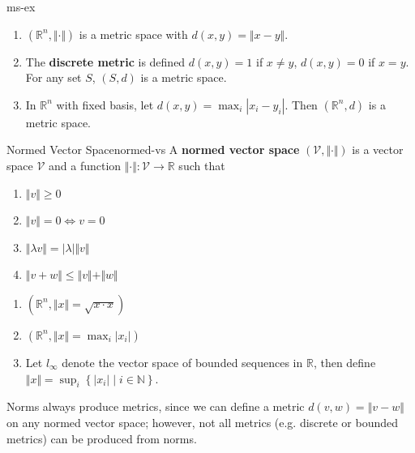 \documentclass[10pt]{report}
\begin{document}
\begin{ex}{}{ms-ex}
	 \begin{enumerate}
		 \item $(\mathbb{R}^n, \Vert{\cdot}\Vert)$ is a metric space with $d(x,y) = \Vert{x-y}\Vert$.
		 \item The \textbf{discrete metric} is defined $d(x,y)=1$ if $x\neq y$, $d(x,y)=0$ if $x=y$. For any set $S$, $(S,d)$ is a metric space.
		 \item In $\mathbb{R}^n$ with fixed basis, let $d(x,y)=\max_i |x_i-y_i|$. Then $(\mathbb{R}^n, d)$ is a metric space.
	\end{enumerate}
\end{ex}

\begin{defn}{Normed Vector Space}{normed-vs}
	A \textbf{normed vector space} $(\mathcal{V}, \Vert{\cdot}\Vert)$ is a vector space $\mathcal{V}$ and a function $\Vert{\cdot}\Vert:\mathcal{V}\to\mathbb{R}$ such that
	\begin{enumerate}
		\item $\Vert{v}\Vert\geq 0$ 
		\item $\Vert{v}\Vert=0 \iff v=0$
		\item $\Vert{\lambda v}\Vert=|\lambda| \Vert{v}\Vert$ 
		\item $\Vert{v+w}\Vert\leq \Vert{v}\Vert+\Vert{w}\Vert$
	\end{enumerate}
\end{defn}

\begin{ex}{}{}
	\begin{enumerate}
		\item $(\mathbb{R}^n, \Vert{x}\Vert=\sqrt{x\cdot x})$ 
		\item $(\mathbb{R}^n, \Vert{x}\Vert=\max_i |x_i|)$ 
		\item Let $l_{\infty}$ denote the vector space of bounded sequences in $\mathbb{R}$, then define $\Vert{x}\Vert=\sup_i \left\{ |x_i| \;|\; i\in \mathbb{N} \right\}$.
	\end{enumerate}
\end{ex}

Norms always produce metrics, since we can define a metric $d(v,w)=\Vert{v-w}\Vert$ on any normed vector space; however, not all metrics (e.g. discrete or bounded metrics) can be produced from norms.
\end{document}
